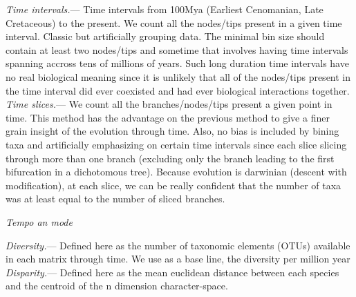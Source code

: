 \documentclass[12pt,letterpaper]{article}
\renewcommand{\subsection}[1]{%
\bigskip
\begin{center}
\begin{large}
\normalfont\itshape #1
\end{large}
\end{center}}
\renewcommand{\subsubsection}[1]{%
\vspace{2ex}
\noindent
\textit{#1.}---}
\begin{document}
\subsubsection{Time intervals}
Time intervals from 100Mya (Earliest Cenomanian, Late Cretaceous) to the present.
We count all the nodes/tips present in a given time interval.
Classic but artificially grouping data. The minimal bin size should contain at least two nodes/tips and sometime that involves having time intervals spanning accross tens of millions of years. Such long duration time intervals have no real biological meaning since it is unlikely that all of the nodes/tips present in the time interval did ever coexisted and had ever biological interactions together.
\subsubsection{Time slices}
We count all the branches/nodes/tips present a given point in time. This method has the advantage on the previous method to give a finer grain insight of the evolution through time. Also, no bias is included by bining taxa and artificially emphasizing on certain time intervals since each slice slicing through more than one branch (excluding only the branch leading to the first bifurcation in a dichotomous tree). Because evolution is darwinian (descent with modification), at each slice, we can be really confident that the number of taxa was at least equal to the number of sliced branches.

\subsection{Tempo an mode}
\subsubsection{Diversity}
Defined here as the number of taxonomic elements (OTUs) available in each matrix through time. We use as a base line, the diversity per million year 
\subsubsection{Disparity}
Defined here as the mean euclidean distance between each species and the centroid of the n dimension character-space.
\end{document}
